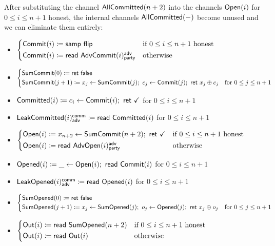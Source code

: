 \noindent After substituting the channel $\mathsf{AllCommitted}(n+2)$ into the channels $\mathsf{Open}(i)$ for $0 \leq i \leq n+1$ honest, the internal channels $\mathsf{AllCommitted}(-)$ become unused and we can eliminate them entirely:

\begin{itemize}
\item {\color{blue} $\begin{cases*} \Commit(i) \coloneqq \samp{\flip} & \text{if $0 \leq i \leq n+1$ honest} \\ \Commit(i) \coloneqq \read{\AdvCommit(i)^\adv_\party} & \text{otherwise} \end{cases*}$}
\item {\color{blue} $\begin{cases*} \SumCommit(0) \coloneqq \ret{\false} & \\ \SumCommit(j+1) \coloneqq x_j \leftarrow \SumCommit(j); \ c_j \leftarrow \Commit(j); \ \ret{x_j \oplus c_j} & \text{for $0 \leq j \leq n+1$} \end{cases*}$}
\item {\color{magenta} $\mathsf{Committed}(i) \coloneqq c_i \leftarrow \mathsf{Commit}(i); \ \mathsf{ret} \ \checkmark$ for $0 \leq i \leq n+1$}
\item {\color{magenta} $\mathsf{LeakCommitted}(i)^{\mathsf{comm}}_{\mathsf{adv}} \coloneqq \mathsf{read} \ \mathsf{Committed}(i)$ for $0 \leq i \leq n+1$}
\item {\color{teal} $\begin{cases*} \Open(i) \coloneqq x_{n+2} \leftarrow \SumCommit(n+2); \ \ret{\checkmark} & \text{if $0 \leq i \leq n+1$ honest} \\ \Open(i) \coloneqq \read{\AdvOpen(i)^\adv_\party} & \text{otherwise} \end{cases*}$}
\item {\color{red} $\mathsf{Opened}(i) \coloneqq \_ \leftarrow \mathsf{Open}(i); \ \mathsf{read} \ \mathsf{Commit}(i)$ for $0 \leq i \leq n+1$}
\item {\color{red} $\mathsf{LeakOpened}(i)^{\mathsf{comm}}_{\mathsf{adv}} \coloneqq \mathsf{read} \ \mathsf{Opened}(i)$ for $0 \leq i \leq n+1$}
\item {\color{red} $\begin{cases*} \SumOpened(0) \coloneqq \ret{\false} & \\ \SumOpened(j+1) \coloneqq x_j \leftarrow \SumOpened(j); \ o_j \leftarrow \Opened(j); \ \ret{x_j \oplus o_j} & \text{for $0 \leq j \leq n+1$} \end{cases*}$}
\item $\begin{cases*} \Out(i) \coloneqq \read{\SumOpened(n+2)} & \text{if $0 \leq i \leq n+1$ honest} \\ \Out(i) \coloneqq \read{\Out(i)} & \text{otherwise} \end{cases*}$
\end{itemize}

